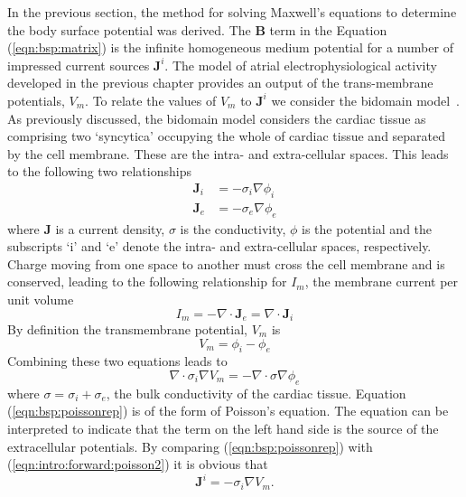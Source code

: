 In the previous section, the method for solving Maxwell's equations to determine
the body surface potential was derived.
The $\mathbf{B}$ term in the Equation (\ref{eqn:bsp:matrix}) is the infinite
homogeneous medium potential for a number of impressed current sources
$\mathbf{J}^i$.
The model of atrial electrophysiological activity developed in the previous
chapter provides an output of the trans-membrane potentials, $V_m$.
To relate the values of $V_m$ to $\mathbf{J}^i$ we consider the bidomain
model~\cite{Tung1978,Geselowitz1989}.
As previously discussed, the bidomain model considers the cardiac tissue as
comprising two `syncytica' occupying the whole of cardiac tissue and separated
by the cell membrane.
These are the intra- and extra-cellular spaces.
This leads to the following two relationships
\begin{align}
\label{eqn:bsp:bidomaini}
\mathbf{J}_i & = -\sigma_i \nabla \phi_i \\
\label{eqn:bsp:bidomaine}
\mathbf{J}_e & = -\sigma_e \nabla \phi_e
\end{align}
where $\mathbf{J}$ is a current density, $\sigma$ is the conductivity, $\phi$
is the potential and the subscripts `i' and `e' denote the intra- and
extra-cellular spaces, respectively.
Charge moving from one space to another must cross the cell membrane and is
conserved, leading to the following relationship for $I_m$, the membrane current per unit
volume
\begin{equation}
\label{eqn:bsp:im}
I_m = -\nabla\cdot\mathbf{J}_e = \nabla\cdot\mathbf{J}_i
\end{equation}
By definition the transmembrane potential, $V_m$ is
\begin{equation}
\label{eqn:bsp:tmp}
V_m = \phi_i - \phi_e
\end{equation}
Combining these two equations leads to
\begin{equation}
\label{eqn:bsp:poissonrep}
\nabla\cdot\sigma_i\nabla V_m = -\nabla\cdot\sigma\nabla\phi_e
\end{equation}
where $\sigma = \sigma_i + \sigma_e$, the bulk conductivity of the cardiac
tissue.
Equation (\ref{eqn:bsp:poissonrep}) is of the form of Poisson's equation.
The equation can be interpreted to indicate that the term on the left hand side
is the source of the extracellular potentials.
By comparing (\ref{eqn:bsp:poissonrep}) with (\ref{eqn:intro:forward:poisson2}) it is
obvious that
\begin{equation}
\label{eqn:bsp:ji}
\mathbf{J}^i = -\sigma_i\nabla V_m.
\end{equation}

